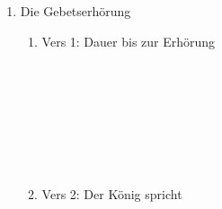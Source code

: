 \documentclass[fontsize=16pt]{mybib}
\begin{document}
\begin{enumerate}
\begin{enumerate}
            \\
            \\
            \\
            \\
            \\
            \\
            \\
            \item Vers 10: Sie gehören dazu
            \\
            \\
            \\
            \\
            \\
            \\
            \\
            \\
            \item Vers 11: Die Bitte an Gott
            \\
            \\
            \\
            \\
            \\
            \\
            \\
            \\
        \end{enumerate}
        \item Die Gebetserhörung
        \begin{enumerate}
            \item Vers 1: Dauer bis zur Erhörung
            \\
            \\
            \\
            \\
            \\
            \\
            \\
            \\
            \item Vers 2: Der König spricht
            \\
            \\
            \\
            \\
            \\
            \\
            \\

\end{enumerate}
\end{enumerate}
\end{document}

